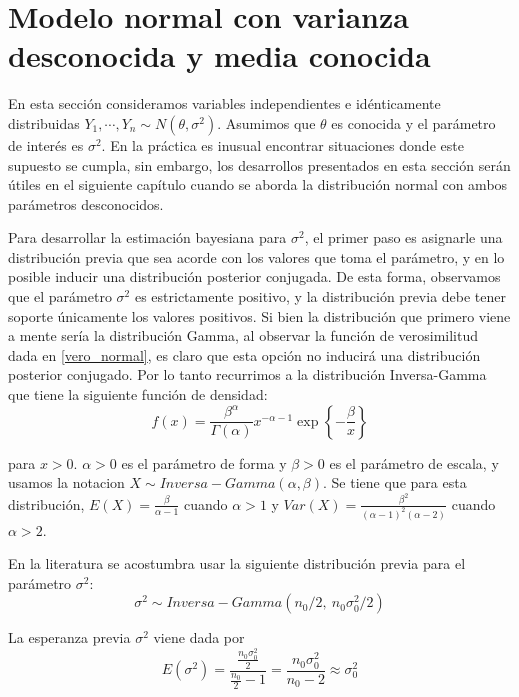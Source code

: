 \documentclass[10pt,openright]{book}\usepackage[]{graphicx}\usepackage[]{color}
\begin{document}
    \section{Modelo normal con varianza desconocida y media conocida}\label{Normal_Varianza}
    
    En esta secci\'on consideramos variables independientes e id\'enticamente distribuidas $Y_1,\cdots,Y_n\sim N(\theta,\sigma^2)$. Asumimos que $\theta$ es conocida y el par\'ametro de inter\'es es $\sigma^2$. En la pr\'actica es inusual encontrar situaciones donde este supuesto se cumpla, sin embargo, los desarrollos presentados en esta secci\'on ser\'an \'utiles en el siguiente cap\'itulo cuando se aborda la distribuci\'on normal con ambos par\'ametros desconocidos. 
    
    Para desarrollar la estimaci\'on bayesiana para $\sigma^2$, el primer paso es asignarle una distribuci\'on previa que sea acorde con los valores que toma el par\'ametro, y en lo posible inducir una distribuci\'on posterior conjugada. De esta forma, observamos que el par\'ametro $\sigma^2$ es estrictamente positivo, y la distribuci\'on previa debe tener soporte \'unicamente los valores positivos. Si bien la distribuci\'on que primero viene a mente ser\'ia la distribuci\'on Gamma, al observar la funci\'on de verosimilitud dada en \ref{vero_normal}, es claro que esta opci\'on no inducir\'a una distribuci\'on posterior conjugado. Por lo tanto recurrimos a la distribuci\'on Inversa-Gamma que tiene la siguiente funci\'on de densidad:
    \begin{equation}\label{densi_Inv_Gamma}
    f(x)=\dfrac{\beta^\alpha}{\Gamma(\alpha)}x^{-\alpha-1}\exp\left\{-\frac{\beta}{x}\right\}
    \end{equation}
    
    para $x>0$. $\alpha>0$ es el par\'ametro de forma y $\beta>0$ es el par\'ametro de escala, y usamos la notacion $X\sim Inversa-Gamma(\alpha,\beta)$. Se tiene que para esta distribuci\'on, $E(X)=\frac{\beta}{\alpha-1}$ cuando $\alpha>1$ y $Var(X)=\frac{\beta^2}{(\alpha-1)^2(\alpha-2)}$ cuando $\alpha>2$.
    
    En la literatura se acostumbra usar la siguiente distribuci\'on previa para el par\'ametro $\sigma^2$:
    \begin{equation*}
    \sigma^2 \sim Inversa-Gamma(n_0/2,\ n_0\sigma^2_0/2)
    \end{equation*}
    
    La esperanza previa $\sigma^2$ viene dada por
    \begin{equation*}
    E(\sigma^2)=\dfrac{\frac{n_0\sigma^2_0}{2}}{\frac{n_0}{2}-1}=\dfrac{n_0\sigma^2_0}{n_0-2}\approx\sigma^2_0
    \end{equation*}
    
\end{document}
